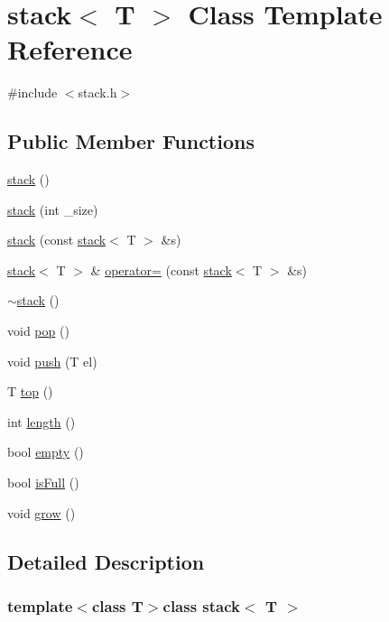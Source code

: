 \hypertarget{classstack}{}\section{stack$<$ T $>$ Class Template Reference}
\label{classstack}


{\ttfamily \#include $<$stack.\+h$>$}

\subsection*{Public Member Functions}
\begin{DoxyCompactItemize}
\item 
\hyperlink{classstack_aa8ea23f5addc21045afa420fcd1dd095}{stack} ()
\item 
\hyperlink{classstack_a7eb62e7655ba78f0534f88850c2866de}{stack} (int \+\_\+size)
\item 
\hyperlink{classstack_a85d45e2f29af41b16cc2b01d5226d57e}{stack} (const \hyperlink{classstack}{stack}$<$ T $>$ \&s)
\item 
\hyperlink{classstack}{stack}$<$ T $>$ \& \hyperlink{classstack_a820581009a802af45029281eb1d3c260}{operator=} (const \hyperlink{classstack}{stack}$<$ T $>$ \&s)
\item 
\hyperlink{classstack_ace7791b755d237a7c48db0114eec1df9}{$\sim$stack} ()
\item 
void \hyperlink{classstack_ad6615a82d944ce2e9a9c260b1d126666}{pop} ()
\item 
void \hyperlink{classstack_af3bba4174712c958a68dee462d94a043}{push} (T el)
\item 
T \hyperlink{classstack_a6093fd7036685b3d9ea89e96609465ac}{top} ()
\item 
int \hyperlink{classstack_a2eb476947957c77e4d2ef35499f53749}{length} ()
\item 
bool \hyperlink{classstack_ab82d4f94c3a83318499848de576feede}{empty} ()
\item 
bool \hyperlink{classstack_abe8b89579b33ece0adbf0567dd7aba27}{is\+Full} ()
\item 
void \hyperlink{classstack_a606d1a37334efa34059b1415137d39c2}{grow} ()
\end{DoxyCompactItemize}


\subsection{Detailed Description}
\subsubsection*{template$<$class T$>$class stack$<$ T $>$}

